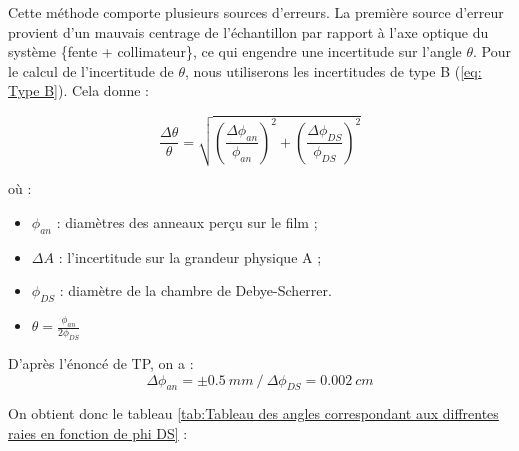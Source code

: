 Cette méthode comporte plusieurs sources d'erreurs. La première source d'erreur provient d'un mauvais centrage de l'échantillon par rapport à l'axe optique du système \{fente + collimateur\}, ce qui engendre une incertitude sur l'angle $\theta$. Pour le calcul de l'incertitude de $\theta$, nous utiliserons les incertitudes de type B (\ref{eq: Type B}). Cela donne :

\begin{equation}\label{eq:TypeB_theta}
	\frac{\Delta \theta}{\theta} = \sqrt{\left ( \frac{\Delta \phi_{an}}{\phi_{an}} \right )^2 + \left ( \frac{\Delta \phi_{DS}}{\phi_{DS}} \right )^2 }
\end{equation}

où :

\begin{itemize}
	\item $\phi_{an}$ : diamètres des anneaux perçu sur le film ;
	
	\item $\Delta A$ : l'incertitude sur la grandeur physique A ;
	

	
	\item $\phi_{DS}$ : diamètre de la chambre de Debye-Scherrer.
	
	\item $\theta = \frac{\phi_{an}}{2\phi_{DS}}$
\end{itemize}

D'après l'énoncé de TP, on a :
\begin{equation}
	\Delta \phi_{an} = \pm 0.5 \ mm  \ / \ \Delta \phi_{DS} = 0.002 \ cm
\end{equation}

On obtient donc le tableau \ref{tab:Tableau des angles correspondant aux diffrentes raies en fonction de phi DS} : 










